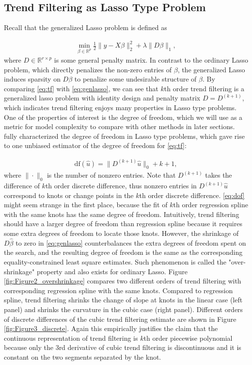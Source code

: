 \documentclass[a4paper]{article}
\newcommand{\RR}{\mathbb{R}}
\begin{document}
\subsection{Trend Filtering as Lasso Type Problem}
\label{subsec:tfaslasso}


Recall that the generalized Lasso problem is defined as

\begin{align}
\min_{\beta\in\RR^p} \frac{1}{2}\|y-X\beta\|_2^2 + \lambda\|D\beta\|_1, 
\label{eq:genlasso}
\end{align}
where $D\in\RR^{r\times p}$ is some general penalty matrix. In contrast to the ordinary Lasso problem, which directly penalizes the non-zero entries of $\beta$, the generalized Lasso induces sparsity on $D\beta$ to penalize some undesirable structure of $\beta$. By comparing \eqref{eq:tf} with \eqref{eq:genlasso}, we can see that $k$th order trend filtering is a generalized lasso problem with identity design and penalty matrix $D = D^{(k+1)}$, which indicates trend filtering enjoys many properties in Lasso type problems. One of the properties of interest is the degree of freedom, which we will use as a metric for model complexity to compare with other methods in later sections. \cite{tibshirani2011solution} fully characterized the degree of freedom in Lasso type problems, which gave rise to one unbiased estimator of the degree of freedom for \eqref{eq:tf}: 




\begin{align}
\mbox{df}(\hat{u}) = \|D^{(k+1)}\hat{u}\|_0 + k + 1, \label{eq:dof}
\end{align}
where $\|\cdot\|_0$ is the number of nonzero entries. Note that $D^{(k+1)}$ takes the difference of $k$th order discrete difference, thus nonzero entries in $D^{(k+1)}\hat{u}$ correspond to knots or change points in the $k$th order discrete difference. \eqref{eq:dof} might seem strange in the first place, because the fit of $k$th order regression spline with the same knots has the same degree of freedom. Intuitively, trend filtering should have a larger degree of freedom than regression spline because it requires some extra degrees of freedom to locate those knots. However, the shrinkage of $D\hat{\beta}$ to zero in \eqref{eq:genlasso} counterbalances the extra degrees of freedom spent on the search, and the resulting degree of freedom is the same as the corresponding equality-constrained least square estimates. Such phenomenon is called the "over-shrinkage" property and also exists for ordinary Lasso. Figure \ref{fig:Figure2_overshrinkage} compares two different orders of trend filtering with corresponding regression spline with the same knots. Compared to regression spline, trend filtering shrinks the change of slope at knots in the linear case (left panel) and shrinks the curvature in the cubic case (right panel). Different orders of discrete differences of the cubic trend filtering estimate are shown in Figure \ref{fig:Figure3_discrete}. Again this empirically justifies the claim that the continuous representation of trend filtering is $k$th order piecewise polynomial because only the $3$rd derivative of cubic trend filtering is discontinuous and it is constant on the two segments separated by the knot.  
\end{document}
